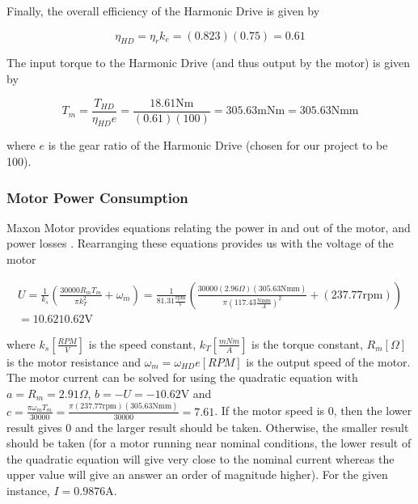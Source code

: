 Finally, the overall efficiency of the Harmonic Drive is given by

\begin{equation}
    \eta_{HD} = \eta_r k_e = (0.823)(0.75) = 0.61
\end{equation}{}

The input torque to the Harmonic Drive (and thus output by the motor) is given by

\begin{equation}
    T_{m} = \frac{T_{HD}}{\eta_{HD} e} = \frac{18.61\text{Nm}}{(0.61)(100)} = 305.63\text{mNm} = 305.63\text{Nmm}
\end{equation}{}

where $e$ is the gear ratio of the Harmonic Drive (chosen for our project to be 100).


\subsubsection{Motor Power Consumption} \label{subsubsec:power_motor}

Maxon Motor provides equations relating the power in and out of the motor, and power losses \cite{maxon_motor_maxon_2014}.
Rearranging these equations provides us with the voltage of the motor

\begin{equation}
    \begin{split}
        U = \frac{1}{k_s} \left(\frac{30000R_m T_m}{\pi k_T^2} + \omega_m\right) = \frac{1}{81.31\frac{\text{rpm}}{V}} \left(\frac{30000(2.96\Omega) (305.63\text{Nmm})}{\pi (117.43\frac{\text{Nmm}}{A})^2} + (237.77\text{rpm})\right) 
        \\
        = 10.62\text{10.62V}
    \end{split}
\end{equation}{}

where $k_s \left[\frac{RPM}{V}\right]$ is the speed constant, $k_T \left[\frac{mNm}{A}\right]$ is the torque constant, $R_m [\Omega]$ is the motor resistance and $\omega_m = \omega_{HD} e [RPM]$ is the output speed of the motor.
The motor current can be solved for using the quadratic equation with $a=R_m =2.91\Omega$, $b=-U =-10.62\text{V}$ and $c=\frac{\pi \omega_m T_m}{30000}=\frac{\pi (237.77\text{rpm})(305.63\text{Nmm})}{30000}=7.61$.
If the motor speed is 0, then the lower result gives 0 and the larger result should be taken.
Otherwise, the smaller result should be taken (for a motor running near nominal conditions, the lower result of the quadratic equation will give very close to the nominal current whereas the upper value will give an answer an order of magnitude higher).
For the given instance, $I = 0.9876\text{A}$.


